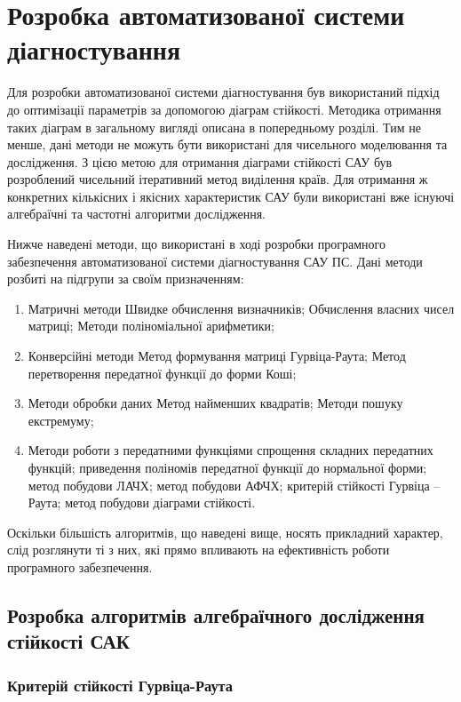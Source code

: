 \section{Розробка автоматизованої системи діагностування}

Для розробки автоматизованої системи діагностування був використаний підхід до оптимізації параметрів за допомогою діаграм стійкості. Методика отримання таких діаграм в загальному вигляді описана в попередньому розділі. Тим не менше, дані методи не можуть бути використані для чисельного моделювання та дослідження. З цією метою для отримання діаграми стійкості САУ був розроблений чисельний ітеративний метод виділення країв. Для отримання ж конкретних кількісних і якісних характеристик САУ були використані вже існуючі алгебраїчні та частотні алгоритми дослідження.

Нижче наведені методи, що використані в ході розробки програмного забезпечення 
автоматизованої системи діагностування САУ ПС. Дані методи розбиті на підгрупи 
за своїм призначенням:

\begin{enumerate}
 \item Матричні методи
  \subitem Швидке обчислення визначників;
  \subitem Обчислення власних чисел матриці;
  \subitem Методи поліноміальної арифметики;
 \item Конверсійні методи
  \subitem Метод формування матриці Гурвіца-Раута;
  \subitem Метод перетворення передатної функції до форми Коші;
 \item Методи обробки даних
  \subitem Метод найменших квадратів;
  \subitem Методи пошуку екстремуму;
 \item Методи роботи з передатними функціями
 \subitem спрощення складних передатних функцій;
 \subitem приведення поліномів передатної функції до нормальної форми;
 \subitem метод побудови ЛАЧХ;
 \subitem метод побудови АФЧХ;
 \subitem критерій стійкості Гурвіца – Раута;
 \subitem метод побудови діаграми стійкості.
\end{enumerate}

Оскільки більшість алгоритмів, що наведені вище, носять прикладний характер, слід розглянути ті з них, які прямо впливають на ефективність роботи програмного забезпечення.

\subsection{Розробка алгоритмів алгебраїчного дослідження стійкості САК}
\subsubsection{Критерій стійкості Гурвіца-Раута}


